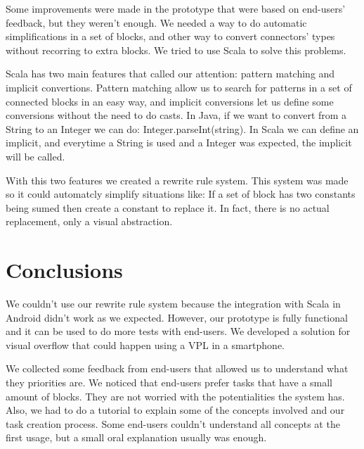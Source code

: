 \documentclass[9pt,a4paper]{extarticle}
\begin{document}
\begin{multicols}{2}
Some improvements were made in the prototype that were based on end-users' feedback, but they weren't enough.
We needed a way to do automatic simplifications in a set of blocks, and other way to convert connectors' types without recorring
to extra blocks. We tried to use Scala to solve this problems.

Scala has two main features that called our attention: pattern matching and implicit convertions. Pattern matching allow us to search for patterns in a set of connected blocks in an easy way, and implicit conversions let us define some conversions without the need to do casts. In Java, if we want to convert from a String to an Integer we can do: Integer.parseInt(string). In Scala we can define an implicit,
and everytime a String is used and a Integer was expected, the implicit will be called.

With this two features we created a rewrite rule system. This system was made so it could automatcly simplify situations like:
If a set of block has two constants being sumed then create a constant to replace it. In fact, there is no actual replacement,
only a visual abstraction. 

\section{Conclusions}\label{sec:conclui}

We couldn't use our rewrite rule system because the integration with Scala in Android didn't work as we expected.
However, our prototype is fully functional and it can be used to do more tests with end-users.
We developed a solution for visual overflow that could happen using a VPL in a smartphone. 

We collected some feedback from end-users that allowed us to understand what they priorities are.
We noticed that end-users prefer tasks that have a small amount of blocks. They are not worried with the potentialities
the system has. Also, we had to do a tutorial to explain some of the concepts involved and our task creation process. Some end-users couldn't understand all concepts at the first usage, but a small oral explanation usually was enough. 



\end{multicols}
\end{document}
